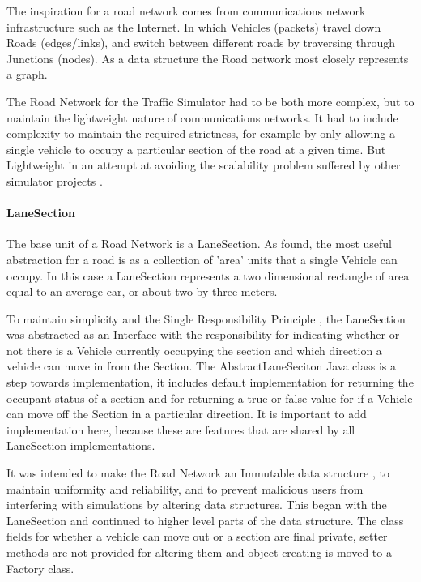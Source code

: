 \documentclass[11pt]{article}
\begin{document}
{\begin{itemize}
The inspiration for a road network comes from communications network infrastructure such as the Internet. In which Vehicles (packets) travel down Roads (edges/links), and switch between different roads by traversing through Junctions (nodes). As a data structure the Road network most closely represents a graph.

The Road Network for the Traffic Simulator had to be both more complex, but to maintain the lightweight nature of communications networks. It had to include complexity to maintain the required strictness, for example by only allowing a single vehicle to occupy a particular section of the road at a given time. But Lightweight in an attempt at avoiding the scalability problem suffered by other simulator projects \cite{website:SUMO-SimOfUrbMob}.


    \paragraph{LaneSection}
    
    The base unit of a Road Network is a LaneSection. As \cite{SewWilMer10} found, the most useful abstraction for a road is as a collection of 'area' units that a single Vehicle can occupy. In this case a LaneSection represents a two dimensional rectangle of area equal to an average car, or about two by three meters.
    
    To maintain simplicity and the Single Responsibility Principle \cite{website:Principles-of-OOD}, the LaneSection was abstracted as an Interface with the responsibility for indicating whether or not there is a Vehicle currently occupying the section and which direction a vehicle can move in from the Section. The AbstractLaneSeciton Java class is a step towards implementation, it includes default implementation for returning the occupant status of a section and for returning a true or false value for if a Vehicle can move off the Section in a particular direction. It is important to add implementation here, because these are features that are shared by all LaneSection implementations.
    
    It was intended to make the Road Network an Immutable data structure \cite{website:Oracle-Imm-Obj}, to maintain uniformity and reliability, and to prevent malicious users from interfering with simulations by altering data structures. This began with the LaneSection and continued to higher level parts of the data structure. The class fields for whether a vehicle can move out or a section are final private, setter methods are not provided for altering them and object creating is moved to a Factory class.
    

\end{itemize}}
\end{document}
